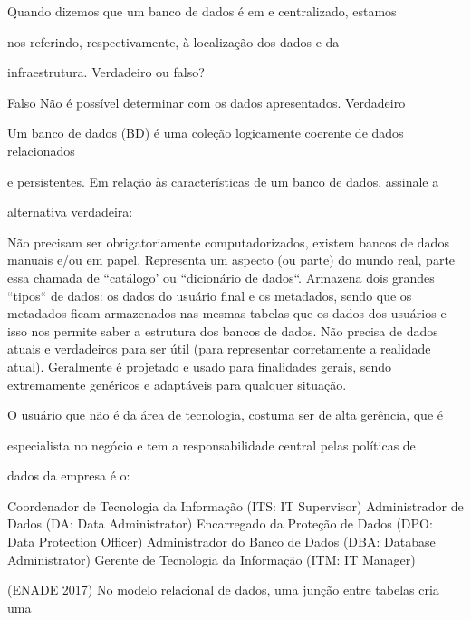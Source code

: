 \documentclass[12pt, addpoints]{exam}
\begin{document}
\begin{questions}
\question

Quando dizemos que um banco de dados é em  e centralizado, estamos

nos referindo, respectivamente, à localização dos dados e da

infraestrutura. Verdadeiro ou falso?
\begin{choices}
\choice Falso
\choice Não é possível determinar com os dados apresentados.
\choice Verdadeiro
\end{choices}

\question

Um banco de dados (BD) é uma coleção logicamente coerente de dados relacionados

e persistentes. Em relação às características de um banco de dados, assinale a

alternativa verdadeira:
\begin{choices}
\choice Não precisam ser obrigatoriamente computadorizados, existem bancos de dados manuais e/ou em papel.
\choice Representa um aspecto (ou parte) do mundo real, parte essa chamada de ``catálogo' ou ``dicionário de dados``.
\choice Armazena dois grandes ``tipos`` de dados: os dados do usuário final e os metadados, sendo que os metadados ficam armazenados nas mesmas tabelas que os dados dos usuários e isso nos permite saber a estrutura dos bancos de dados.
\choice Não precisa de dados atuais e verdadeiros para ser útil (para representar corretamente a realidade atual).
\choice Geralmente é projetado e usado para finalidades gerais, sendo extremamente genéricos e adaptáveis para qualquer situação.
\end{choices}

\question

O usuário que não é da área de tecnologia, costuma ser de alta gerência, que é

especialista no negócio e tem a responsabilidade central pelas políticas de

dados da empresa é o:
\begin{choices}
\choice Coordenador de Tecnologia da Informação (ITS: IT Supervisor)
\choice Administrador de Dados (DA: Data Administrator)
\choice Encarregado da Proteção de Dados (DPO: Data Protection Officer)
\choice Administrador do Banco de Dados (DBA: Database Administrator)
\choice Gerente de Tecnologia da Informação (ITM: IT Manager)
\end{choices}

\question

(ENADE 2017) No modelo relacional de dados, uma junção entre tabelas cria uma


\end{questions}
\end{document}

